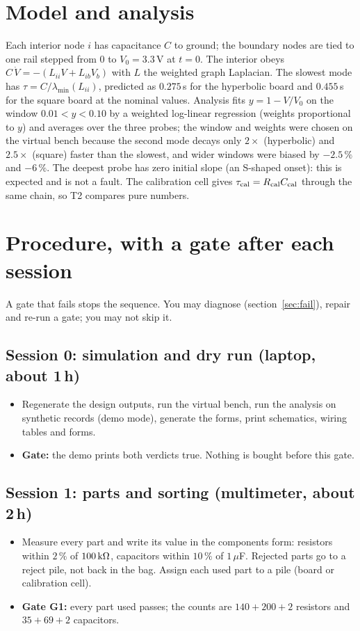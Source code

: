 \documentclass[11pt,a4paper]{article}
\newcommand{\chk}{$\square$\ }
\begin{document}
\section{Model and analysis}
Each interior node $i$ has capacitance $C$ to ground; the boundary nodes are tied to one rail stepped from $0$ to $V_0=3.3$\,V at $t=0$. The interior obeys $C\,\dot V=-(L_{ii}V+L_{ib}V_b)$ with $L$ the weighted graph Laplacian. The slowest mode has $\tau=C/\lambda_{\min}(L_{ii})$, predicted as $0.275$\,s for the hyperbolic board and $0.455$\,s for the square board at the nominal values.
Analysis fits $y=1-V/V_0$ on the window $0.01<y<0.10$ by a weighted log-linear regression (weights proportional to $y$) and averages over the three probes; the window and weights were chosen on the virtual bench because the second mode decays only $2\times$ (hyperbolic) and $2.5\times$ (square) faster than the slowest, and wider windows were biased by $-2.5\,\%$ and $-6\,\%$.
The deepest probe has zero initial slope (an S-shaped onset): this is expected and is not a fault. The calibration cell gives $\tau_{\rm cal}=R_{\rm cal}C_{\rm cal}$ through the same chain, so T2 compares pure numbers.

\section{Procedure, with a gate after each session}
A gate that fails stops the sequence. You may diagnose (section~\ref{sec:fail}), repair and re-run a gate; you may not skip it.

\subsection*{Session 0: simulation and dry run (laptop, about 1\,h)}
\begin{itemize}
\item[\chk] Regenerate the design outputs, run the virtual bench, run the analysis on synthetic records (demo mode), generate the forms, print schematics, wiring tables and forms.
\item[] \textbf{Gate:} the demo prints both verdicts true. Nothing is bought before this gate.
\end{itemize}

\subsection*{Session 1: parts and sorting (multimeter, about 2\,h)}
\begin{itemize}
\item[\chk] Measure every part and write its value in the components form: resistors within $2\,\%$ of $100\,{\rm k}\Omega$, capacitors within $10\,\%$ of $1\,\mu$F. Rejected parts go to a reject pile, not back in the bag. Assign each used part to a pile (board or calibration cell).
\item[] \textbf{Gate G1:} every part used passes; the counts are $140+200+2$ resistors and $35+69+2$ capacitors.
\end{itemize}
\end{document}
